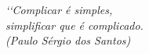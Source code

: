 \begin{epigrafe}
\vspace*{\fill}
\begin{flushright}
\textit{‘‘Complicar é simples, \\
simplificar que é complicado.\\
(Paulo Sérgio dos Santos)}
\end{flushright}
\end{epigrafe}
